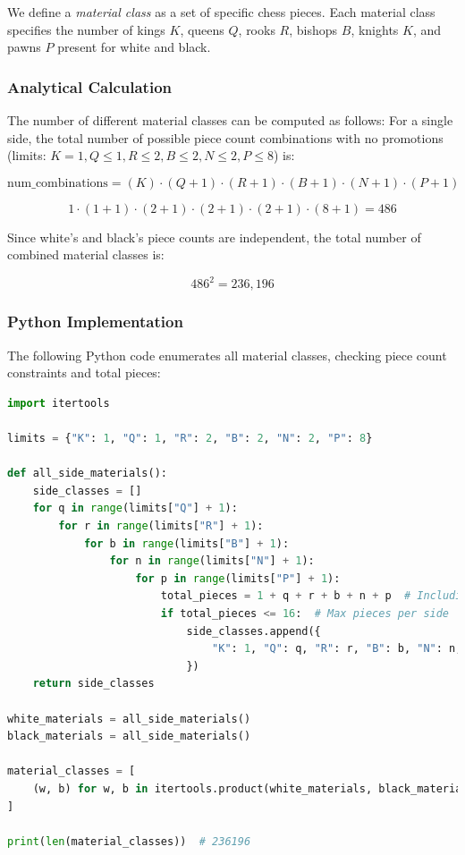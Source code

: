 \documentclass[12pt]{article}
\begin{document}
We define a \emph{material class} as a set of specific chess pieces. Each material class specifies the number of kings $K$, queens $Q$, rooks $R$, bishops $B$, knights $K$, and pawns $P$ present for white and black.

\subsubsection{Analytical Calculation}

The number of different material classes can be computed as follows: 
For a single side, the total number of possible piece count combinations with no promotions 
(limits: $K = 1, Q \le 1, R \le 2, B \le 2, N \le 2, P \le 8$) is:

\[
\text{num\_combinations} = (K) \cdot (Q + 1) \cdot (R + 1) \cdot (B + 1) \cdot (N + 1) \cdot (P + 1)
\]

\[
1 \cdot (1 + 1) \cdot (2 + 1) \cdot (2 + 1) \cdot (2 + 1) \cdot (8 + 1) = 486
\]

Since white's and black's piece counts are independent, the total number of
combined material classes is:

\[
486^2 = 236{,}196
\]

\subsubsection{Python Implementation}

The following Python code enumerates all material classes, checking piece
count constraints and total pieces:

\begin{lstlisting}[language=Python, caption={Enumeration of all material classes in chess}, label={lst:material-classes}]
import itertools

limits = {"K": 1, "Q": 1, "R": 2, "B": 2, "N": 2, "P": 8}

def all_side_materials():
    side_classes = []
    for q in range(limits["Q"] + 1):
        for r in range(limits["R"] + 1):
            for b in range(limits["B"] + 1):
                for n in range(limits["N"] + 1):
                    for p in range(limits["P"] + 1):
                        total_pieces = 1 + q + r + b + n + p  # Including 1 king always
                        if total_pieces <= 16:  # Max pieces per side
                            side_classes.append({
                                "K": 1, "Q": q, "R": r, "B": b, "N": n, "P": p
                            })
    return side_classes

white_materials = all_side_materials()
black_materials = all_side_materials()

material_classes = [
    (w, b) for w, b in itertools.product(white_materials, black_materials)
]

print(len(material_classes))  # 236196
\end{lstlisting}
\end{document}
